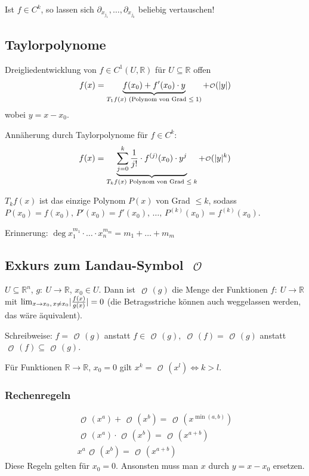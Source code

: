 \documentclass[a4paper,10pt]{article}
\def\R{\mathbb{R}}
\def\smallCalO{\begin{smallmatrix}\!\mathcal{O}\!\end{smallmatrix}}  %
\DeclarePairedDelimiter\abs{\lvert}{\rvert}
\begin{document}
\begin{subbox}{}
    Ist \( f \in C^k \), so lassen sich \( \partial_{x_{j_1}}, \dots, \partial_{x_{j_k}} \) beliebig vertauschen!
\end{subbox}


\subsection{Taylorpolynome}

Dreigliedentwicklung von \( f \in C^1(U, \R) \) für \( U \subseteq \R \) offen
\[ f(x) = \underbrace{f(x_0) + f'(x_0) \cdot y}_{T_1 f(x) \text{ (Polynom von Grad \( \leq 1 \))}} + \smallCalO(\abs{y}) \]
wobei \( y = x - x_0 \).

Annäherung durch Taylorpolynome für \( f \in C^k \):
\[ f(x) = \underbrace{\sum_{j = 0}^k \frac{1}{j!} \cdot f^{(j)}(x_0) \cdot y^j}_{T_k f(x) \text{ Polynom von Grad \( \leq k \)}} + \smallCalO(\abs{y}^k) \]

\( T_k f(x) \) ist das einzige Polynom \( P(x) \) von Grad \( \leq k \), sodass \( P(x_0) = f(x_0), \, P'(x_0) = f'(x_0), \, \dots, \, P^{(k)}(x_0) = f^{(k)}(x_0) \).

Erinnerung: \( \deg x_1^{m_1} \cdot \dots \cdot x_n^{m_m} = m_1 + \dots + m_m \)


\subsection{Exkurs zum Landau-Symbol \texorpdfstring{\( \smallCalO \)}{ℴ}}

\begin{mainbox}{}
    \( U \subseteq \R^n \), \( g: \: U \to \R \), \( x_0 \in U \). Dann ist \emph{\( \smallCalO(g) \)} die Menge der Funktionen \( f: \: U \to \R \) mit \( \lim_{x \to x_0, \, x \neq x_0} \abs{\frac{f(x)}{g(x)}} = 0 \) (die Betragsstriche können auch weggelassen werden, das wäre äquivalent).

    Schreibweise: \( f = \smallCalO(g) \) anstatt \( f \in \smallCalO(g) \), \( \smallCalO(f) = \smallCalO(g) \) anstatt \( \smallCalO(f) \subseteq \smallCalO(g) \).

    Für Funktionen \( \R \to \R \), \( x_0 = 0 \) gilt \( x^k = \smallCalO(x^l) \iff k > l \).
\end{mainbox}

\subsubsection{Rechenregeln}
\begin{gather*}
    \smallCalO(x^a) + \smallCalO(x^b) = \smallCalO(x^{\min(a, b)}) \\
    \smallCalO(x^a) \cdot \smallCalO(x^b) = \smallCalO(x^{a + b}) \\
    x^a \smallCalO(x^b) = \smallCalO(x^{a + b})
\end{gather*}
Diese Regeln gelten für \( x_0 = 0 \). Ansonsten muss man \( x \) durch \( y = x - x_0 \) ersetzen.
\end{document}
